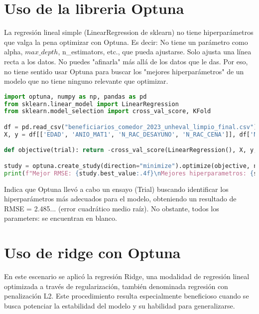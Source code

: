 \documentclass{article}
\begin{document}
\section{Uso de la libreria Optuna}

La regresión lineal simple (LinearRegression de sklearn) no tiene hiperparámetros que valga la pena optimizar con Optuna. Es decir: No tiene un parámetro como alpha, $max\_depth$, n\_estimators, etc., que pueda ajustarse. Solo ajusta una línea recta a los datos. No puedes "afinarla" más allá de los datos que le das. Por eso, no tiene sentido usar Optuna para buscar los "mejores hiperparámetros" de un modelo que no tiene ninguno relevante que optimizar.

\begin{lstlisting}[language=Python, caption={Ejemplo de código en Python}]
import optuna, numpy as np, pandas as pd
from sklearn.linear_model import LinearRegression
from sklearn.model_selection import cross_val_score, KFold

df = pd.read_csv("beneficiarios_comedor_2023_unheval_limpio_final.csv")[lambda x: x['N_RAC_ALMUERZO'] > 0]
X, y = df[['EDAD', 'ANIO_MAT1', 'N_RAC_DESAYUNO', 'N_RAC_CENA']], df['N_RAC_ALMUERZO']

def objective(trial): return -cross_val_score(LinearRegression(), X, y, cv=KFold(5, shuffle=True, random_state=42), scoring='neg_root_mean_squared_error').mean()

study = optuna.create_study(direction="minimize").optimize(objective, n_trials=30)
print(f"Mejor RMSE: {study.best_value:.4f}\nMejores hiperparametros: {study.best_params}")

\end{lstlisting}


\begin{tcolorbox}
    Indica que Optuna llevó a cabo un ensayo (Trial) buscando identificar los hiperparámetros más adecuados para el modelo, obteniendo un resultado de RMSE = 2.485...  (error cuadrático medio raíz).  No obstante, todos los parameters: {} se encuentran en blanco.
\end{tcolorbox}


\section{Uso de ridge con Optuna}

En este escenario se aplicó la regresión Ridge, una modalidad de regresión lineal optimizada a través de regularización, también denominada regresión con penalización L2.  Este procedimiento resulta especialmente beneficioso cuando se busca potenciar la estabilidad del modelo y su habilidad para generalizarse.
\end{document}

